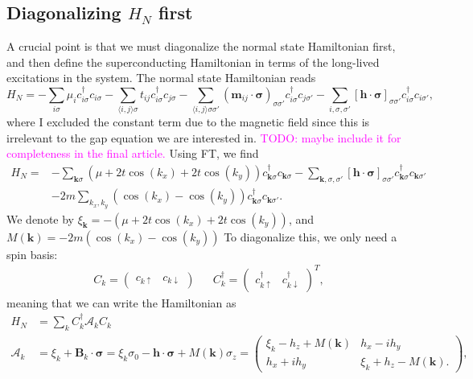 \documentclass[aps,onecolumn,amsmath,amssymb,preprintnumbers,floatfix,prl,superscriptaddress,longbibliography]{revtex4-2}%
\newcommand{\hans}[1]{\textcolor{Magenta}{{#1}}}
\renewcommand\vec{\mathbf}
\begin{document}
\subsection{Diagonalizing $
H_N$ first}
A crucial point is that we must diagonalize the normal state Hamiltonian first, and then define the superconducting Hamiltonian in terms of the long-lived excitations in the system.
The normal state Hamiltonian reads
\begin{equation}
    H_N =
		- \sum_{i\sigma} \mu_i c^\dag_{i\sigma} c_{i\sigma}
		- \sum_{\langle i, j \rangle \sigma} t_{ij} c^\dag_{i\sigma} c_{j\sigma}
		- \sum_{\langle i, j \rangle \sigma\sigma'} (\bm{m}_{ij} \cdot \boldsymbol{\sigma})_{\sigma\sigma'} c^\dag_{i\sigma} c_{j\sigma'}
  -
  \sum_{i, \sigma, \sigma'} [\vec h \cdot \boldsymbol \sigma]_{\sigma \sigma'} c^\dag_{i\sigma} c_{i\sigma'},
\end{equation}
where I excluded the constant term due to the magnetic field since this is irrelevant to the gap equation we are interested in. \hans{TODO: maybe include it for completeness in the final article.}
Using FT, we find
\begin{align}
    H_N=& 
		- \sum_{\vec k \sigma}(\mu + 2t \cos(k_x) + 2t \cos(k_y) ) c^\dag_{\vec k \sigma} c_{\vec k\sigma}
  -
    \sum_{\vec k, \sigma, \sigma'} [\vec h \cdot \boldsymbol \sigma]_{\sigma\sigma'} c^\dag_{\vec k \sigma} c_{\vec k \sigma'}
    \\
	&
    -2m \sum_{k_x, k_y} (\cos(k_x) - \cos(k_y)) 
    c^\dag_{\vec k\sigma} c_{\vec k\sigma'}.
\end{align}
We denote by $\xi_\vec{k} = - (\mu + 2t \cos(k_x) + 2t \cos(k_y) )$, and $M(\vec k) = - 2m (\cos(k_x) - \cos(k_y)) $
To diagonalize this, we only need a spin basis:
\begin{align}
    C_k = \begin{pmatrix}
        c_{k \uparrow} & c_{k \downarrow}
    \end{pmatrix}
    &&
     C_k^\dag = \begin{pmatrix}
        c_{k \uparrow}^\dag & c_{k \downarrow}^\dag
    \end{pmatrix}^T,
\end{align}
meaning that we can write the Hamiltonian as
\begin{align}
    H_N &= \sum_k C_k^\dag \mathcal A_k C_k
    \\
    \mathcal A_k &= \xi_k + \vec B_k \cdot \boldsymbol \sigma =  \xi_k \sigma_0 - \vec h \cdot \boldsymbol \sigma + M(\vec k) \sigma_z = 
    \begin{pmatrix}
        \xi_k - h_z + M(\vec k) & h_x - i h_y\\
        h_x + i h_y & \xi_k + h_z - M(\vec k).
    \end{pmatrix},
\end{align}
\end{document}
